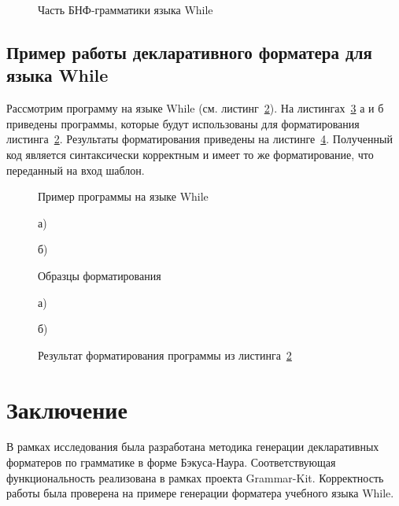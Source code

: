 \documentclass[conference]{IEEEtran}
\begin{document}
\begin{figure}[h]
	\centering
	
	\caption{Часть БНФ-грамматики языка While}
	\label{whileBnf}
\end{figure}

\subsection{Пример работы декларативного форматера для языка While}
Рассмотрим программу на языке While (см. листинг~\ref{whileProg}).
На листингах~\ref{whileTs} а и б приведены программы, которые будут использованы для форматирования листинга~\ref{whileProg}.
Результаты форматирования приведены на листинге~\ref{whileRes}.
Полученный код является синтаксически корректным и имеет то же форматирование, что переданный на вход шаблон.

\begin{figure}[h]
	\centering
	
	\caption{Пример программы на языке While}
	\label{whileProg}
\end{figure}

\begin{figure}[ht]
\noindent\begin{minipage}{.2\textwidth}
    
\caption*{а)}    
\end{minipage}\hfill
\begin{minipage}{.2\textwidth}
    
\caption*{б)}    
\end{minipage}
\caption{Образцы форматирования}    
\label{whileTs}
\end{figure}

\begin{figure}[ht]
\noindent\begin{minipage}{.2\textwidth}
    
\caption*{а)}    
\end{minipage}\hfill
\begin{minipage}{.2\textwidth}
    
\caption*{б)}    
\end{minipage}
\caption{Результат форматирования программы из листинга~\ref{whileProg}}
\label{whileRes}
\end{figure}

\section{Заключение}
В рамках исследования была разработана методика генерации декларативных форматеров по грамматике в форме Бэкуса-Наура.
Соответствующая функциональность реализована в рамках проекта Grammar-Kit.
Корректность работы была проверена на примере генерации форматера учебного языка While.
\end{document}
